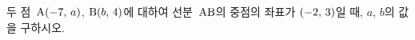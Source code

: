 두 점~$\mathrm{A}(-7,\mkern3mu a)$, $\mathrm{B}(b,\mkern3mu 4)$에 대하여 선분~$\mathrm{AB}$의 중점의 좌표가 $(-2,\mkern3mu 3)$일 때, $a$, $b$의 값을 구하시오.
